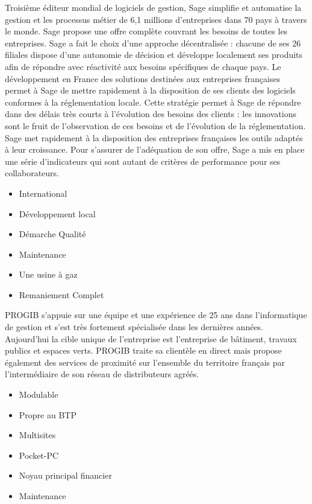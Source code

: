 {
        Troisième éditeur mondial de logiciels de gestion, Sage simplifie et automatise la gestion et les processus métier de 6,1 millions d'entreprises dans 70 pays à travers le monde.
        Sage propose une offre complète couvrant les besoins de toutes les entreprises.
        Sage a fait le choix d'une approche décentralisée : chacune de ses 26 filiales dispose d'une autonomie
        de décision et développe localement ses produits afin de répondre avec réactivité aux besoins spécifiques de chaque pays.
        Le développement en France des solutions destinées aux entreprises françaises permet  à  Sage de mettre rapidement à la disposition de ses clients des logiciels conformes à la réglementation locale.
        Cette stratégie permet à Sage de répondre dans des délais très courts  à  l'évolution des besoins des clients : les innovations sont le fruit de l'observation de ces besoins et de l'évolution de la réglementation.
        Sage met rapidement à la disposition des entreprises françaises les outils adaptés à leur croissance.
        Pour s'assurer de l'adéquation de son offre, Sage a mis en place une série d'indicateurs qui sont autant de critères de performance pour ses collaborateurs.
}
{
    \begin{itemize}
        \item International
        \item Développement local
        \item Démarche Qualité
        \item Maintenance
    \end{itemize}
}
{
    \begin{itemize}
        \item Une usine à gaz%
        \item Remaniement Complet
    \end{itemize}
}

{
    PROGIB s'appuie sur une équipe et une expérience de 25 ans dans l'informatique de gestion et s'est très fortement spécialisée dans les dernières années.
    Aujourd'hui la cible unique de l'entreprise est l'entreprise de bâtiment, travaux publics et espaces verts.
    PROGIB traite sa clientèle en direct mais propose également des services de proximité sur l'ensemble du territoire
    français par l'intermédiaire de son réseau de distributeurs agréés.
}
{
    \begin{itemize}
        \item Modulable
        \item Propre au BTP
        \item Multisites
        \item Pocket-PC
    \end{itemize}
}
{
    \begin{itemize}
        \item Noyau principal financier
        \item Maintenance%
    \end{itemize}
}
